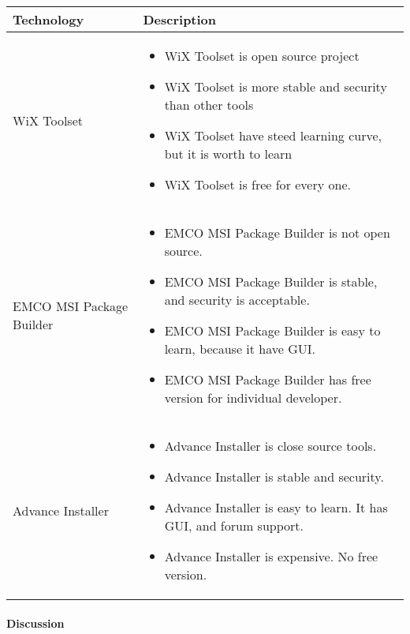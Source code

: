 \begin{center}
    \begin{tabular}{ | l | p{10cm} |}
      \hline
      Technology & Description  \\ \hline
      WiX Toolset \cite{Wix_tool} &
      \begin{itemize}
        \item WiX Toolset is open source project 
        \item WiX Toolset is more stable and security than other tools
        \item WiX Toolset have steed learning curve, but it is worth to learn
        \item WiX	Toolset is free for every one.
      \end{itemize} \\ \hline

      EMCO MSI Package Builder \cite{EMCO_MSI} &
      \begin{itemize}
        \item EMCO MSI Package Builder is not open source.
        \item EMCO MSI Package Builder is stable, and security is acceptable.
        \item EMCO MSI Package Builder is easy to learn, because it have GUI.
        \item EMCO MSI Package Builder has free version for individual developer.
      \end{itemize} \\ \hline

      Advance Installer \cite{advanced_install} &
      \begin{itemize}
        \item Advance Installer is close source tools.
        \item Advance Installer is stable and security.
        \item Advance Installer is easy to learn. It has GUI, and forum support.
        \item Advance Installer is expensive. No free version.
      \end{itemize} \\ \hline
    \end{tabular}
\end{center}

\paragraph{Discussion}

